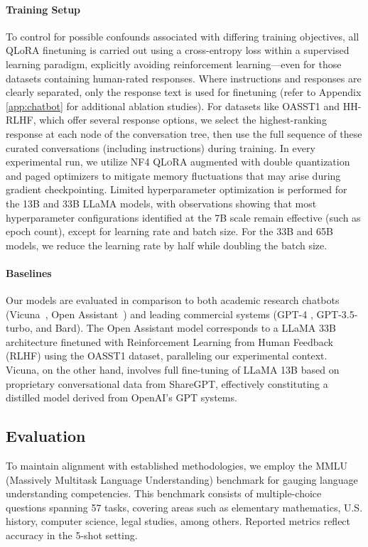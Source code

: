 \paragraph{Training Setup} To control for possible confounds associated with differing training objectives, all QLoRA finetuning is carried out using a cross-entropy loss within a supervised learning paradigm, explicitly avoiding reinforcement learning—even for those datasets containing human-rated responses. Where instructions and responses are clearly separated, only the response text is used for finetuning (refer to Appendix \ref{app:chatbot} for additional ablation studies). For datasets like OASST1 and HH-RLHF, which offer several response options, we select the highest-ranking response at each node of the conversation tree, then use the full sequence of these curated conversations (including instructions) during training. In every experimental run, we utilize NF4 \textsc{QLoRA} augmented with double quantization and paged optimizers to mitigate memory fluctuations that may arise during gradient checkpointing. Limited hyperparameter optimization is performed for the 13B and 33B LLaMA models, with observations showing that most hyperparameter configurations identified at the 7B scale remain effective (such as epoch count), except for learning rate and batch size. For the 33B and 65B models, we reduce the learning rate by half while doubling the batch size.

\paragraph{Baselines} Our models are evaluated in comparison to both academic research chatbots (Vicuna~\citep{vicuna2023}, Open Assistant~\citep{kopf2023openassistant}) and leading commercial systems (GPT-4 \citep{openai2023gpt}, GPT-3.5-turbo, and Bard). The Open Assistant model corresponds to a LLaMA 33B architecture finetuned with Reinforcement Learning from Human Feedback (RLHF) using the OASST1 dataset, paralleling our experimental context. Vicuna, on the other hand, involves full fine-tuning of LLaMA 13B based on proprietary conversational data from ShareGPT, effectively constituting a distilled model derived from OpenAI’s GPT systems.

\subsection{Evaluation}

To maintain alignment with established methodologies, we employ the MMLU (Massively Multitask Language Understanding) benchmark \citep{hendrycksmeasuring} for gauging language understanding competencies. This benchmark consists of multiple-choice questions spanning 57 tasks, covering areas such as elementary mathematics, U.S. history, computer science, legal studies, among others. Reported metrics reflect accuracy in the 5-shot setting.

